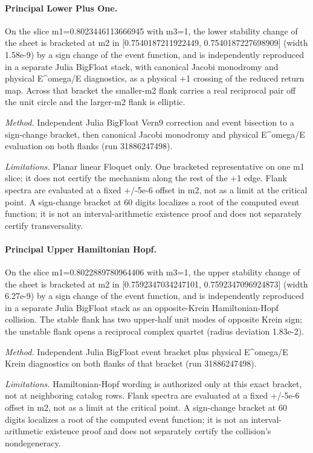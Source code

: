 \paragraph{Principal Lower Plus One.}
On the slice m1=0.8023446113666945 with m3=1, the lower stability change of the sheet is bracketed at m2 in [0.7540187211922449, 0.7540187227698909] (width 1.58e-9) by a sign change of the event function, and is independently reproduced in a separate Julia BigFloat stack, with canonical Jacobi monodromy and physical E\^{}omega/E diagnostics, as a physical +1 crossing of the reduced return map. Across that bracket the smaller-m2 flank carries a real reciprocal pair off the unit circle and the larger-m2 flank is elliptic.

\emph{Method.} Independent Julia BigFloat Vern9 correction and event bisection to a sign-change bracket, then canonical Jacobi monodromy and physical E\^{}omega/E evaluation on both flanks (run 31886247498).

\emph{Limitations.} Planar linear Floquet only. One bracketed representative on one m1 slice; it does not certify the mechanism along the rest of the +1 edge. Flank spectra are evaluated at a fixed +/-5e-6 offset in m2, not as a limit at the critical point. A sign-change bracket at 60 digits localizes a root of the computed event function; it is not an interval-arithmetic existence proof and does not separately certify transversality.

\paragraph{Principal Upper Hamiltonian Hopf.}
On the slice m1=0.8022889780964406 with m3=1, the upper stability change of the sheet is bracketed at m2 in [0.7592347034247101, 0.7592347096924873] (width 6.27e-9) by a sign change of the event function, and is independently reproduced in a separate Julia BigFloat stack as an opposite-Krein Hamiltonian-Hopf collision. The stable flank has two upper-half unit modes of opposite Krein sign; the unstable flank opens a reciprocal complex quartet (radius deviation 1.83e-2).

\emph{Method.} Independent Julia BigFloat event bracket plus physical E\^{}omega/E Krein diagnostics on both flanks of that bracket (run 31886247498).

\emph{Limitations.} Hamiltonian-Hopf wording is authorized only at this exact bracket, not at neighboring catalog rows. Flank spectra are evaluated at a fixed +/-5e-6 offset in m2, not as a limit at the critical point. A sign-change bracket at 60 digits localizes a root of the computed event function; it is not an interval-arithmetic existence proof and does not separately certify the collision's nondegeneracy.


